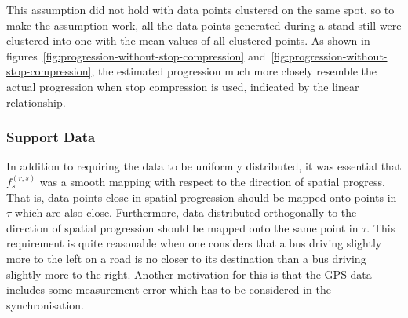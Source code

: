 \noindent
This assumption did not hold with data points clustered on the same spot, so to make the assumption work, all the data points generated during a stand-still were clustered into one with the mean values of all clustered points. As shown in figures~\ref{fig:progression-without-stop-compression} and~\ref{fig:progression-without-stop-compression}, the estimated progression much more closely resemble the actual progression when stop compression is used, indicated by the linear relationship.

\subsubsection{Support Data}
In addition to requiring the data to be uniformly distributed, it was essential that $f^{(r,s)}_s$ was a smooth mapping with respect to the direction of spatial progress. That is, data points close in spatial progression should be mapped onto points in $\tau$ which are also close. Furthermore, data distributed orthogonally to the direction of spatial progression should be mapped onto the same point in $\tau$. This requirement is quite reasonable when one considers that a bus driving slightly more to the left on a road is no closer to its destination than a bus driving slightly more to the right. Another motivation for this is that the GPS data includes some measurement error which has to be considered in the synchronisation.

